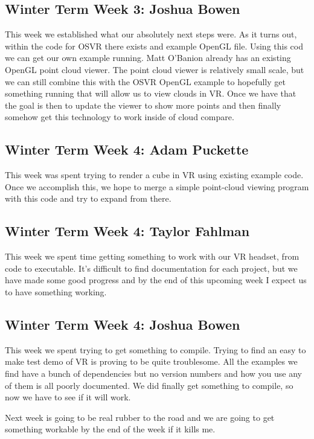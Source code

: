 \documentclass[draftclsnofoot,onecolumn]{IEEEtran}
\begin{document}
\subsection{Winter Term Week 3: Joshua Bowen}

This week we established what our absolutely next steps were. As it turns out, within the code for OSVR there exists and example OpenGL file. Using this cod we can get our own example running. Matt O'Banion already has an existing OpenGL point cloud viewer. The point cloud viewer is relatively small scale, but we can still combine this with the OSVR OpenGL example to hopefully get something running that will allow us to view clouds in VR. Once we have that the goal is then to update the viewer to show more points and then finally somehow get this technology to work inside of cloud compare.

\subsection{Winter Term Week 4: Adam Puckette}

This week was spent trying to render a cube in VR using existing example code. Once we accomplish this, we hope to merge a simple point-cloud viewing program with this code and try to expand from there.

\subsection{Winter Term Week 4: Taylor Fahlman}

This week we spent time getting something to work with our VR headset, from code to executable. It's difficult to find documentation for each project, but we have made some good progress and by the end of this upcoming week I expect us to have something working.

\subsection{Winter Term Week 4: Joshua Bowen}

This week we spent trying to get something to compile. Trying to find an easy to make test demo of VR is proving to be quite troublesome. All the examples we find have a bunch of dependencies but no version numbers and how you use any of them is all poorly documented. We did finally get something to compile, so now we have to see if it will work.

Next week is going to be real rubber to the road and we are going to get something workable by the end of the week if it kills me.
\end{document}
